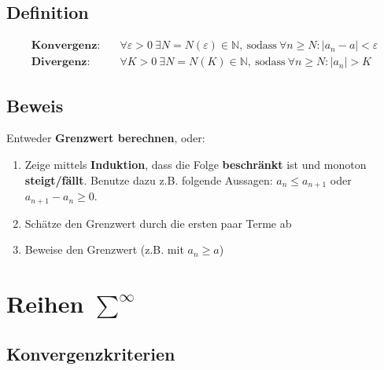 \documentclass[11pt]{article}
\begin{document}
\subsection{Definition}

\begin{equation*}
\begin{split}
	\textbf{Konvergenz:} \quad & \forall \varepsilon > 0\ \exists N = N(\varepsilon) \in \mathbb{N},\ \text{sodass}\ \forall n \geq N: |a_n - a| < \varepsilon \\
	\textbf{Divergenz:} \quad & \forall K > 0\ \exists N = N(K) \in \mathbb{N},\ \text{sodass}\ \forall n \geq N: |a_n| > K
\end{split}
\end{equation*}

\subsection{Beweis}

Entweder \textbf{Grenzwert berechnen}, oder:

\begin{enumerate}[noitemsep]
	\item Zeige mittels \textbf{Induktion}, dass die Folge \textbf{beschr{\"a}nkt} ist und monoton \textbf{steigt/f{\"a}llt}. Benutze dazu z.B. folgende Aussagen: $a_n \leq a_{n+1}$ oder $a_{n+1}-a_n \geq 0$.
	\item Sch{\"a}tze den Grenzwert durch die ersten paar Terme ab
	\item Beweise den Grenzwert (z.B. mit $a_n \geq a$)
\end{enumerate}

\section{Reihen $\sum^\infty$}

\subsection{Konvergenzkriterien}
\end{document}
